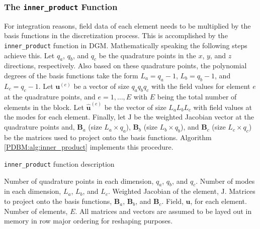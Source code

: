 \documentclass{ccr16}
\begin{document}
{{            \subsubsection{The \texttt{inner\_product} Function}
            {
                For integration reasons, field data of each element needs to be multiplied by the basis functions in the discretization process. This is accomplished by the \texttt{inner\_product} function in DGM. Mathematically speaking the following steps achieve this. Let $q_{a}$, $q_{b}$, and $q_{c}$ be the quadrature points in the $x$, $y$, and $z$ directions, respectively. Also based on these quadrature points, the polynomial degrees of the basis functions take the form $L_{a} = q_{a} - 1$, $L_{b} = q_{b} - 1$, and $L_{c} = q_{c} - 1$. Let $\boldsymbol{u}^{\left ( e \right )}$ be a vector of size $q_{a} q_{b} q_{c}$ with the field values for element $e$ at the quadrature points, and $e = 1, \dots, E$ with $E$ being the total number of elements in the block. Let $\hat{\boldsymbol{u}}^{\left ( e \right )}$ be the vector of size $L_{a} L_{b} L_{c}$ with field values at the modes for each element. Finally, let $\mathrm{J}$ be the weighted Jacobian vector at the quadrature points and, $\boldsymbol{B}_{a}$ (size $L_{a} \times q_{a}$), $\boldsymbol{B}_{b}$ (size $L_{b} \times q_{b}$), and $\boldsymbol{B}_{c}$ (size $L_{c} \times q_{c}$) be the matrices used to project onto the basis functions. Algorithm \ref{PDBM:alg:inner_product} implements this procedure.

                \renewcommand{\algorithmicrequire}{\textbf{Input:}}
                \renewcommand{\algorithmicensure}{\textbf{Output:}}

                \begin{algorithm}[t]
                    \caption{\texttt{inner\_product} function description}

                    \begin{algorithmic}[1]
                        \Require Number of quadrature points in each dimension, $q_{a}$, $q_{b}$, and $q_{c}$. Number of modes in each dimension, $L_{a}$, $L_{b}$, and $L_{c}$. Weighted Jacobian of the element, $\mathrm{J}$. Matrices to project onto the basis functions, $\boldsymbol{B}_{a}$, $\boldsymbol{B}_{b}$, and $\boldsymbol{B}_{c}$. Field, $\boldsymbol{u}$, for each element. Number of elements, $E$. All matrices and vectors are assumed to be layed out in memory in row major ordering for reshaping purposes.


\end{algorithmic}
\end{algorithm}}}}
\end{document}
